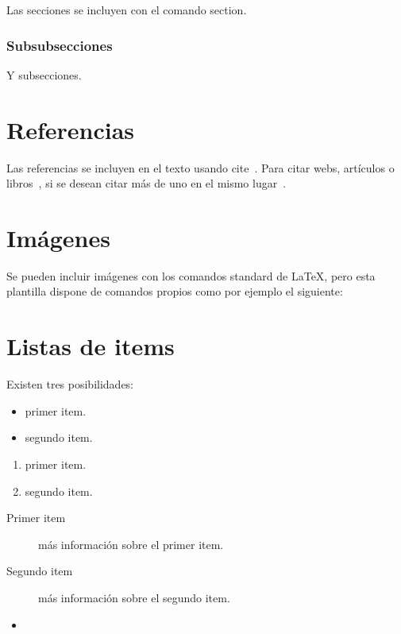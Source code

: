 Las secciones se incluyen con el comando section.

\subsubsection{Subsubsecciones}

Y subsecciones. 


\section{Referencias}

Las referencias se incluyen en el texto usando cite~\cite{wiki:latex}. Para citar webs, artículos o libros~\cite{koza92}, si se desean citar más de uno en el mismo lugar~\cite{bortolot2005, koza92}.


\section{Imágenes}

Se pueden incluir imágenes con los comandos standard de \LaTeX, pero esta plantilla dispone de comandos propios como por ejemplo el siguiente:




\section{Listas de items}

Existen tres posibilidades:

\begin{itemize}
	\item primer item.
	\item segundo item.
\end{itemize}

\begin{enumerate}
	\item primer item.
	\item segundo item.
\end{enumerate}

\begin{description}
	\item[Primer item] más información sobre el primer item.
	\item[Segundo item] más información sobre el segundo item.
\end{description}
	
\begin{itemize}
\item 
\end{itemize}


